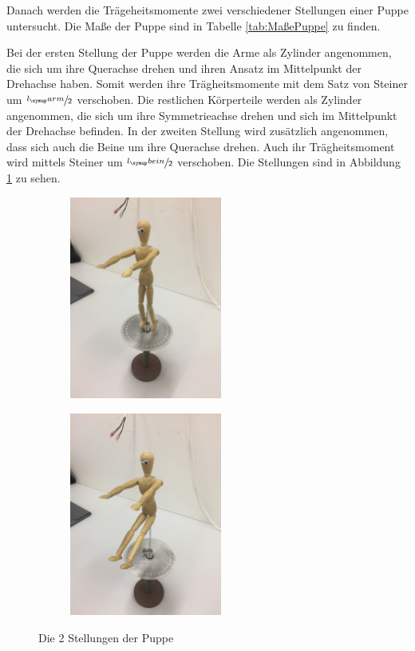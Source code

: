 \noindent Danach werden die Trägeheitsmomente zwei verschiedener Stellungen einer Puppe
untersucht. Die Maße der Puppe sind in Tabelle \ref{tab:MaßePuppe} zu finden.

Bei der ersten Stellung der Puppe werden die Arme als Zylinder angenommen, die sich um
ihre Querachse drehen und ihren Ansatz im Mittelpunkt der Drehachse haben. Somit werden
ihre Trägheitsmomente mit dem Satz von Steiner um $\sfrac{l_\su{arm}}{2}$ verschoben.
Die restlichen Körperteile werden als Zylinder angenommen, die sich um ihre Symmetrieachse
drehen und sich im Mittelpunkt der Drehachse befinden.
In der zweiten Stellung wird zusätzlich angenommen, dass sich auch die Beine um ihre
Querachse drehen. Auch ihr Trägheitsmoment wird mittels Steiner um $\sfrac{l_\su{bein}}{2}$
verschoben. Die Stellungen sind in Abbildung \ref{fig:stellung} zu sehen.
\begin{figure}
  \centering
  \begin{subfigure}{0.48\textwidth}
    \centering
    \includegraphics[width=5cm,angle=-90]{bilder/stellung1.JPG}
  \end{subfigure}
  \begin{subfigure}{0.48\textwidth}
    \centering
    \includegraphics[width=5cm, angle=-90]{bilder/stellung2.JPG}
  \end{subfigure}
  \caption{Die 2 Stellungen der Puppe}
  \label{fig:stellung}
\end{figure}

